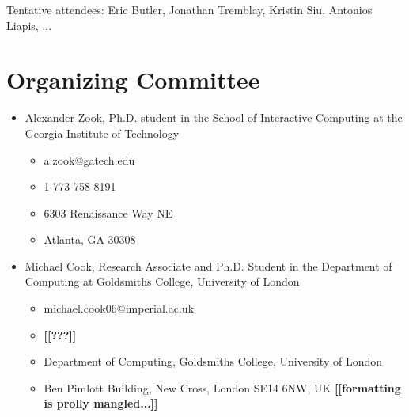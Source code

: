 \documentclass[10pt,a4paper]{article}
\newcommand{\mytodo}[1]{\textbf{[[#1]]}}
\begin{document}
Tentative attendees: Eric Butler, Jonathan Tremblay, Kristin Siu, Antonios Liapis, ...



\section{Organizing Committee}
\begin{itemize}
\item Alexander Zook, Ph.D. student in the School of Interactive Computing at the Georgia Institute of Technology
\begin{itemize}
\item a.zook@gatech.edu
\item 1-773-758-8191
\item 6303 Renaissance Way NE
\item Atlanta, GA 30308
\end{itemize}
\item Michael Cook, Research Associate and Ph.D. Student in the Department of Computing at Goldsmiths College, University of London
\begin{itemize}
\item michael.cook06@imperial.ac.uk
\item \mytodo{???}
\item Department of Computing, Goldsmiths College, University of London
\item Ben Pimlott Building, New Cross, London SE14 6NW, UK \mytodo{formatting is prolly mangled...}
\end{itemize}
\end{itemize}
\end{document}
